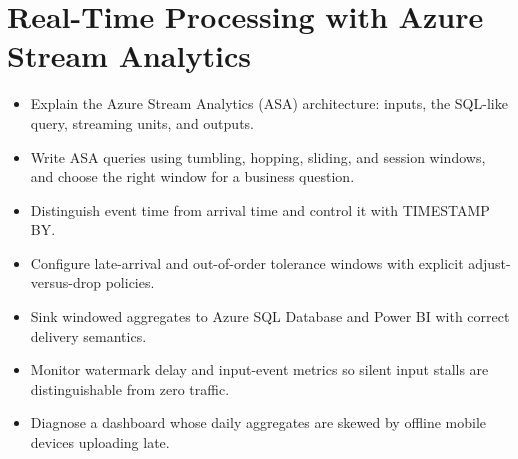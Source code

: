 \chapter{Real-Time Processing with Azure Stream Analytics}
%
\begin{objectives}
\begin{itemize}
    \item Explain the Azure Stream Analytics (ASA) architecture: inputs, the SQL-like query, streaming units, and outputs.
    \item Write ASA queries using tumbling, hopping, sliding, and session windows, and choose the right window for a business question.
    \item Distinguish event time from arrival time and control it with TIMESTAMP BY.
    \item Configure late-arrival and out-of-order tolerance windows with explicit adjust-versus-drop policies.
    \item Sink windowed aggregates to Azure SQL Database and Power BI with correct delivery semantics.
    \item Monitor watermark delay and input-event metrics so silent input stalls are distinguishable from zero traffic.
    \item Diagnose a dashboard whose daily aggregates are skewed by offline mobile devices uploading late.
\end{itemize}
\end{objectives}

